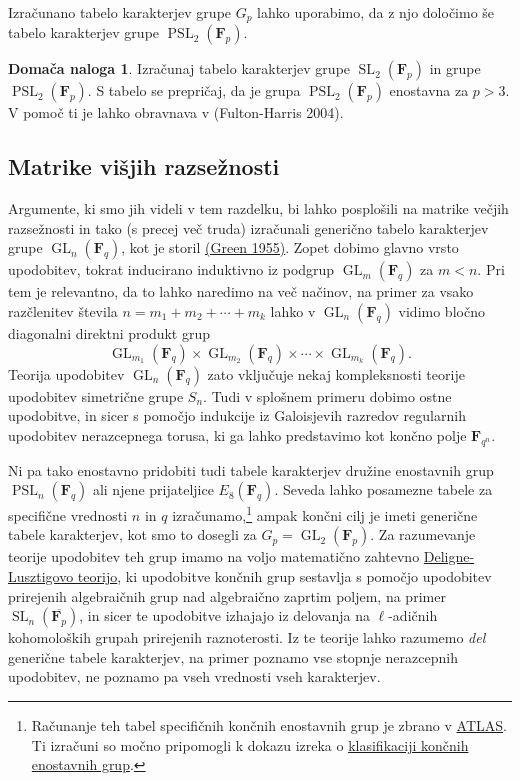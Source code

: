 \documentclass[11pt]{book}
\def\FF{\mathbf{F}}
\DeclareMathOperator\GL{GL}
\DeclareMathOperator\SL{SL}
\DeclareMathOperator\PSL{PSL}
\def\literatura{\color{modra}}
\theoremstyle{definition}
\theoremstyle{zgled}
\theoremstyle{zgledbrezstevilke}
\theoremstyle{odprtproblem}
\theoremstyle{domacanaloga}
\newtheorem{domacanaloga}[theorem]{Domača naloga}
\theoremstyle{izrek}
\begin{document}
Izračunano tabelo karakterjev grupe $G_p$ lahko uporabimo, da z njo določimo še tabelo karakterjev grupe $\PSL_2(\FF_p)$.

\begin{domacanaloga}
Izračunaj tabelo karakterjev grupe $\SL_2(\FF_p)$ in grupe $\PSL_2(\FF_p)$. S tabelo se prepričaj, da je grupa $\PSL_2(\FF_p)$ enostavna za $p > 3$. V pomoč ti je lahko obravnava v {\literatura (Fulton-Harris 2004)}.
\end{domacanaloga}

\subsection{Matrike višjih razsežnosti}

Argumente, ki smo jih videli v tem razdelku, bi lahko posplošili na matrike večjih razsežnosti in tako (s precej več truda) izračunali generično tabelo karakterjev grupe $\GL_n(\FF_q)$, kot je storil \href{https://www.jstor.org/stable/1992997#metadata_info_tab_contents}{(Green 1955)}. Zopet dobimo glavno vrsto upodobitev, tokrat inducirano induktivno iz podgrup $\GL_m(\FF_q)$ za $m < n$. Pri tem je relevantno, da to lahko naredimo na več načinov, na primer za vsako razčlenitev števila $n = m_1 + m_2 + \cdots + m_k$ lahko v $\GL_n(\FF_q)$ vidimo bločno diagonalni direktni produkt grup
\[
    \textstyle  \GL_{m_1}(\FF_q) \times \GL_{m_2}(\FF_q) \times \cdots \times \GL_{m_k}(\FF_q).  
\]
Teorija upodobitev $\GL_n(\FF_q)$ zato vključuje nekaj kompleksnosti teorije upodobitev simetrične grupe $S_n$. Tudi v splošnem primeru dobimo ostne upodobitve, in sicer s pomočjo indukcije iz Galoisjevih razredov regularnih upodobitev nerazcepnega torusa, ki ga lahko predstavimo kot končno polje $\FF_{q^n}$.

Ni pa tako enostavno pridobiti tudi tabele karakterjev družine enostavnih grup $\PSL_n(\FF_q)$ ali njene prijateljice $E_8(\FF_q)$. Seveda lahko posamezne tabele za specifične vrednosti $n$ in $q$ izračunamo,\footnote{Računanje teh tabel specifičnih končnih enostavnih grup je zbrano v \href{http://brauer.maths.qmul.ac.uk/Atlas/v3/}{ATLAS}. Ti izračuni so močno pripomogli k dokazu izreka o \href{https://en.wikipedia.org/wiki/Classification_of_finite_simple_groups}{klasifikaciji končnih enostavnih grup}.} ampak končni cilj je imeti generične tabele karakterjev, kot smo to dosegli za $G_p = \GL_2(\FF_p)$. Za razumevanje teorije upodobitev teh grup imamo na voljo matematično zahtevno \href{https://en.wikipedia.org/wiki/Deligne–Lusztig_theory}{Deligne-Lusztigovo teorijo}, ki upodobitve končnih grup sestavlja s pomočjo upodobitev prirejenih algebraičnih grup nad algebraično zaprtim poljem, na primer $\SL_n(\overline{\FF_p})$, in sicer te upodobitve izhajajo iz delovanja na $\ell$-adičnih kohomoloških grupah prirejenih raznoterosti. Iz te teorije lahko razumemo \emph{del} generične tabele karakterjev, na primer poznamo vse stopnje nerazcepnih upodobitev, ne poznamo pa vseh vrednosti vseh karakterjev.
\end{document}
